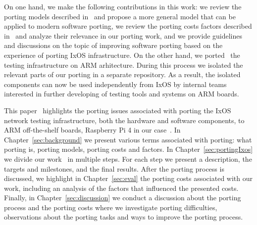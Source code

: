 On one hand, we make the following contributions in this work: we review the
porting models described in~\cite{tanaka,hakuta,kanai} and propose a more
general model that can be applied to modern software porting, we review the
porting costs factors described in~\cite{hakuta} and analyze their relevance in
our porting work, and we provide guidelines and discussions on the topic of
improving software porting based on the experience of porting IxOS
infrastructure. On the other hand, we ported~ the testing infrastructure on ARM
arhitecture. During this process we isolated the relevant parts of our porting
in a separate repository. As a result, the isolated components can now be used
independently from IxOS by internal teams interested in further developing of
testing tools and systems on ARM boards.

This paper~ highlights the porting issues associated with porting the IxOS
network testing infrastructure, both the hardware and software components, to
ARM off-the-shelf boards, Raspberry Pi 4 in our case~. In
Chapter~\ref{sec:background} we present various terms associated with porting:
what porting is, porting models, porting costs and factors. In
Chapter~\ref{sec:portingIxos} we divide our work~ in multiple steps. For each
step we present a description, the targets and milestones, and the final
results. After the porting process is discussed, we highlight in
Chapter~\ref{sec:eval} the porting costs associated with our work, including an
analysis of the factors that influenced the presented costs. Finally, in
Chapter~\ref{sec:discussion} we conduct a discussion about the porting process
and the porting costs where we investigate porting difficulties, observations
about the porting tasks and ways to improve the porting process.~
